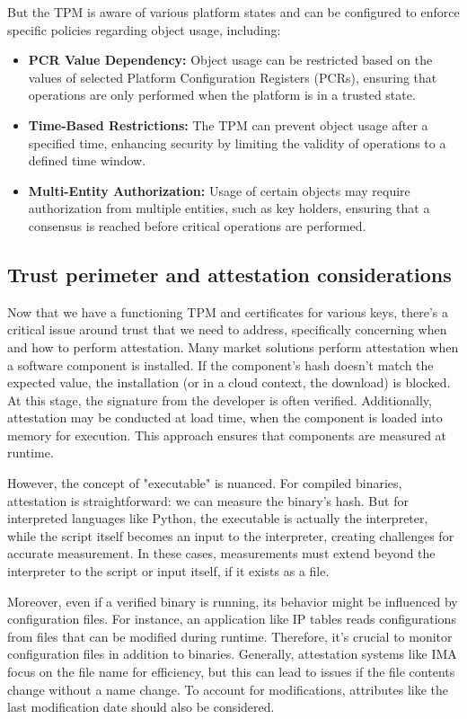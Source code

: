     
But the TPM is aware of various platform states and can be configured
to enforce specific policies regarding object usage, including:
\begin{itemize}
  \item \textbf{PCR Value Dependency:} Object usage can be
    restricted based on the values of selected Platform
    Configuration Registers (PCRs), ensuring that operations are
    only performed when the platform is in a trusted state.

  \item \textbf{Time-Based Restrictions:} The TPM can prevent
    object usage after a specified time, enhancing security by
    limiting the validity of operations to a defined time
    window.

  \item \textbf{Multi-Entity Authorization:} Usage of certain
    objects may require authorization from multiple entities,
    such as key holders, ensuring that a consensus is reached
    before critical operations are performed.
\end{itemize}

\subsection{Trust perimeter and attestation considerations}
Now that we have a functioning TPM and certificates for various keys,
there’s a critical issue around trust that we need to address,
specifically concerning when and how to perform attestation. Many
market solutions perform attestation when a software component is
installed. If the component's hash doesn’t match the expected value,
the installation (or in a cloud context, the download) is blocked. At
this stage, the signature from the developer is often verified.
Additionally, attestation may be conducted at load time, when the
component is loaded into memory for execution. This approach ensures
that components are measured at runtime.

However, the concept of "executable" is nuanced. For compiled
binaries, attestation is straightforward: we can measure the binary’s
hash. But for interpreted languages like Python, the executable is
actually the interpreter, while the script itself becomes an input to
the interpreter, creating challenges for accurate measurement. In
these cases, measurements must extend beyond the interpreter to the
script or input itself, if it exists as a file.

Moreover, even if a verified binary is running, its behavior might be
influenced by configuration files. For instance, an application like
IP tables reads configurations from files that can be modified during
runtime. Therefore, it’s crucial to monitor configuration files in
addition to binaries. Generally, attestation systems like IMA focus on
the file name for efficiency, but this can lead to issues if the file
contents change without a name change. To account for modifications,
attributes like the last modification date should also be considered.

